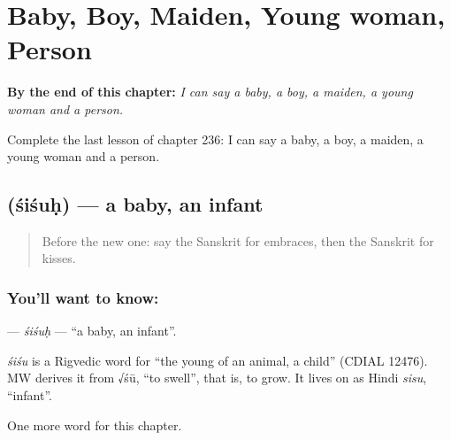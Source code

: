 
\chapter{Baby, Boy, Maiden, Young woman, Person}
\label{ch:sa-baby-boy-maiden-young-woman-person}

\begin{chapteropening}
\textbf{By the end of this chapter:} \emph{I can say a baby, a boy, a maiden, a young woman and a person.}

Complete the last lesson of chapter 236: I can say a baby, a boy, a maiden, a young woman and a person.
\end{chapteropening}

\section[\texorpdfstring{\sk{शिशुः} (śiśuḥ)}{शिशुः (śiśuḥ)}]{ (śiśuḥ) — a baby, an infant}

\label{lesson:SA-C236-sisuh}



\begin{quote}
Before the new one: say the Sanskrit for embraces, then the Sanskrit for kisses.
\end{quote}

\subsection*{You'll want to know: }
\textbf{} — \emph{śiśuḥ} — \textquotedblleft{}a baby, an infant\textquotedblright{}.

\begin{cousinweb}
\emph{śiśu} is a Rigvedic word for \textquotedblleft{}the young of an animal, a child\textquotedblright{} (CDIAL 12476). MW derives it from √śū, \textquotedblleft{}to swell\textquotedblright{}, that is, to grow. It lives on as Hindi \emph{sisu}, \textquotedblleft{}infant\textquotedblright{}.
\end{cousinweb}

\begin{grammarlens}[title={What you've built}]
One more word for this chapter.
\end{grammarlens}

